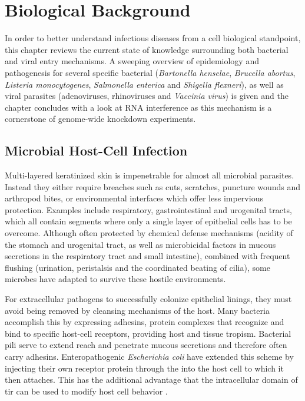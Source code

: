 \chapter{Biological Background}

In order to better understand infectious diseases from a cell biological standpoint, this chapter reviews the current state of knowledge surrounding both bacterial and viral entry mechanisms. A sweeping overview of epidemiology and pathogenesis for several specific bacterial (\textit{Bartonella henselae}, \textit{Brucella abortus}, \textit{Listeria monocytogenes}, \textit{Salmonella enterica} and \textit{Shigella flexneri}), as well as viral parasites (adenoviruses, rhinoviruses and \textit{Vaccinia virus}) is given and the chapter concludes with a look at RNA interference as this mechanism is a cornerstone of genome-wide knockdown experiments.

\section{Microbial Host-Cell Infection}

Multi-layered keratinized skin is impenetrable for almost all microbial parasites. Instead they either require breaches such as cuts, scratches, puncture wounds and arthropod bites, or environmental interfaces which offer less impervious protection. Examples include respiratory, gastrointestinal and urogenital tracts, which all contain segments where only a single layer of epithelial cells has to be overcome. Although often protected by chemical defense mechanisms (acidity of the stomach and urogenital tract, as well as microbicidal factors in mucous secretions in the respiratory tract and small intestine), combined with frequent flushing (urination, peristalsis and the coordinated beating of cilia), some microbes have adapted to survive these hostile environments.

For extracellular pathogens to successfully colonize epithelial linings, they must avoid being removed by cleansing mechanisms of the host. Many bacteria accomplish this by expressing adhesins, protein complexes that recognize and bind to specific host-cell receptors, providing host and tissue tropism. Bacterial pili serve to extend reach and penetrate mucous secretions and therefore often carry adhesins. Enteropathogenic \textit{Escherichia coli} have extended this scheme by injecting their own receptor protein  through the  into the host cell to which it then attaches. This has the additional advantage that the intracellular domain of \gls{tir} can be used to modify host cell behavior \citep{Alberts2008}.

